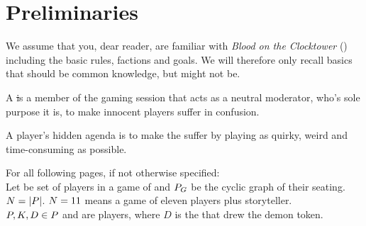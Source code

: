 
\section{Preliminaries}\label{sec:preliminaries}

We assume that you, dear reader, are familiar with \emph{Blood on the Clocktower} (\botc)
including the basic rules, factions and goals.
We will therefore only recall \botc basics that should be common knowledge, but might not be.


\begin{definition}[Storyteller]
    A \st is a member of the gaming session that acts as a neutral moderator,
    who's sole purpose it is, to make innocent players suffer in confusion.
\end{definition}

\begin{definition}
    A player's hidden agenda is to make the \st{ }suffer by playing
    as quirky, weird and time-consuming as possible.
\end{definition}

\begin{definition}[Notations]
    For all following pages, if not otherwise specified:\\
    Let \playerset be set of players in a game \game of \botc
    and $P_G$ be the cyclic graph of their seating.\\
    $N=|P|$.
    $N=11$ means a game of eleven players plus storyteller.\\
    $P, K, D \in P$ and are players, where $D$ is the \player
    that drew the demon token.
\end{definition}

